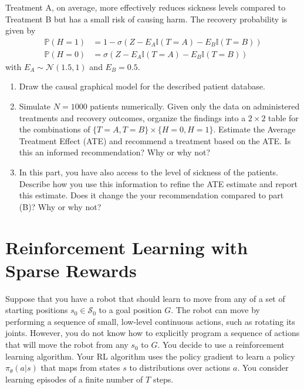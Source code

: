 \documentclass[11pt]{article}
\begin{document}
\noindent Treatment A, on average, more effectively reduces sickness levels compared to Treatment B but has a small risk of causing harm. 
The recovery probability is given by
\begin{align*}
    \mathbb{P}(H = 1) &= 1-\sigma(Z - E_A \mathbb{I}(T = A) - E_B \mathbb{I}(T = B)) \\
    \mathbb{P}(H = 0) &= \sigma(Z - E_A \mathbb{I}(T = A) - E_B \mathbb{I}(T = B))
\end{align*}
with $E_A \sim \mathcal{N}(1.5, 1)$ and $E_B = 0.5$. 

\begin{enumerate}[label=(\Alph*)]
    \item Draw the causal graphical model for the described patient database. 

    \item Simulate $N=1000$ patients numerically.
    Given only the data on administered treatments and recovery outcomes, organize the findings 
    into a $2 \times 2$ table for the combinations of $\{T=A, T=B\} \times \{H=0, H=1\}$. Estimate  
    the Average Treatment Effect (ATE) and recommend a treatment based on the ATE.
    Is this an informed recommendation? Why or why not?

    \item In this part, you have also access to the level of sickness of the patients. 
    Describe how you use this information to refine the ATE estimate and report this estimate. 
    Does it change the your recommendation compared to part (B)? Why or why not?
\end{enumerate} 


\newpage

\section{Reinforcement Learning with Sparse Rewards}

\noindent Suppose that you have a robot that should learn to move from any of a set of starting positions $s_0 \in \mathcal{S}_0$ to a goal position $G$. The robot can move by performing a sequence of small, low-level continuous actions, such as rotating its joints. However, you do not know how to explicitly program a sequence of actions that will move the robot from any $s_0$ to $G$. You decide to use a reinforcement learning algorithm. Your RL algorithm uses the policy gradient to learn a policy $\pi_\theta(a|s)$ that maps from states $s$ to distributions over actions $a$. You consider learning episodes of a finite number of $T$ steps.
\end{document}
